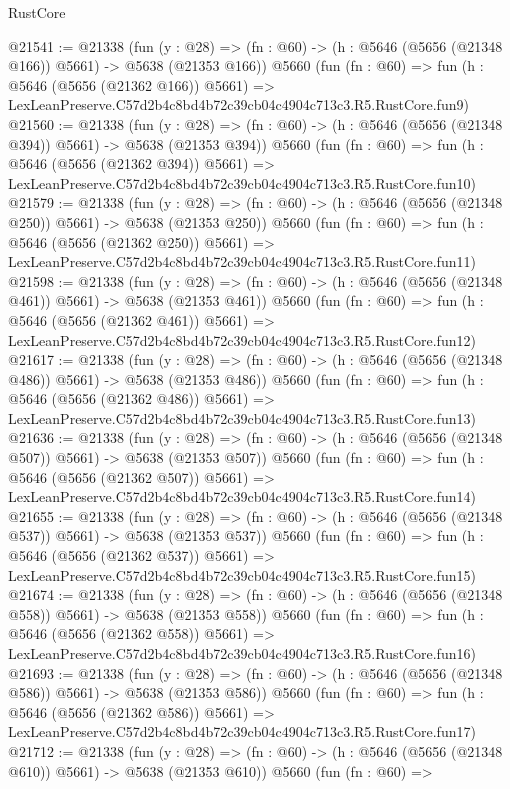 \begin{lexlean}{RustCore}
\begin{coremodule}
@21541 := @21338
    (fun (y : @28) => (fn : @60) -> (h : @5646 (@5656 (@21348 @166)) @5661) -> @5638 (@21353 @166))
    @5660
    (fun (fn : @60) =>
    fun (h : @5646 (@5656 (@21362 @166)) @5661) =>
    LexLeanPreserve.C57d2b4c8bd4b72c39cb04c4904c713c3.R5.RustCore.fun9)
@21560 := @21338
    (fun (y : @28) => (fn : @60) -> (h : @5646 (@5656 (@21348 @394)) @5661) -> @5638 (@21353 @394))
    @5660
    (fun (fn : @60) =>
    fun (h : @5646 (@5656 (@21362 @394)) @5661) =>
    LexLeanPreserve.C57d2b4c8bd4b72c39cb04c4904c713c3.R5.RustCore.fun10)
@21579 := @21338
    (fun (y : @28) => (fn : @60) -> (h : @5646 (@5656 (@21348 @250)) @5661) -> @5638 (@21353 @250))
    @5660
    (fun (fn : @60) =>
    fun (h : @5646 (@5656 (@21362 @250)) @5661) =>
    LexLeanPreserve.C57d2b4c8bd4b72c39cb04c4904c713c3.R5.RustCore.fun11)
@21598 := @21338
    (fun (y : @28) => (fn : @60) -> (h : @5646 (@5656 (@21348 @461)) @5661) -> @5638 (@21353 @461))
    @5660
    (fun (fn : @60) =>
    fun (h : @5646 (@5656 (@21362 @461)) @5661) =>
    LexLeanPreserve.C57d2b4c8bd4b72c39cb04c4904c713c3.R5.RustCore.fun12)
@21617 := @21338
    (fun (y : @28) => (fn : @60) -> (h : @5646 (@5656 (@21348 @486)) @5661) -> @5638 (@21353 @486))
    @5660
    (fun (fn : @60) =>
    fun (h : @5646 (@5656 (@21362 @486)) @5661) =>
    LexLeanPreserve.C57d2b4c8bd4b72c39cb04c4904c713c3.R5.RustCore.fun13)
@21636 := @21338
    (fun (y : @28) => (fn : @60) -> (h : @5646 (@5656 (@21348 @507)) @5661) -> @5638 (@21353 @507))
    @5660
    (fun (fn : @60) =>
    fun (h : @5646 (@5656 (@21362 @507)) @5661) =>
    LexLeanPreserve.C57d2b4c8bd4b72c39cb04c4904c713c3.R5.RustCore.fun14)
@21655 := @21338
    (fun (y : @28) => (fn : @60) -> (h : @5646 (@5656 (@21348 @537)) @5661) -> @5638 (@21353 @537))
    @5660
    (fun (fn : @60) =>
    fun (h : @5646 (@5656 (@21362 @537)) @5661) =>
    LexLeanPreserve.C57d2b4c8bd4b72c39cb04c4904c713c3.R5.RustCore.fun15)
@21674 := @21338
    (fun (y : @28) => (fn : @60) -> (h : @5646 (@5656 (@21348 @558)) @5661) -> @5638 (@21353 @558))
    @5660
    (fun (fn : @60) =>
    fun (h : @5646 (@5656 (@21362 @558)) @5661) =>
    LexLeanPreserve.C57d2b4c8bd4b72c39cb04c4904c713c3.R5.RustCore.fun16)
@21693 := @21338
    (fun (y : @28) => (fn : @60) -> (h : @5646 (@5656 (@21348 @586)) @5661) -> @5638 (@21353 @586))
    @5660
    (fun (fn : @60) =>
    fun (h : @5646 (@5656 (@21362 @586)) @5661) =>
    LexLeanPreserve.C57d2b4c8bd4b72c39cb04c4904c713c3.R5.RustCore.fun17)
@21712 := @21338
    (fun (y : @28) => (fn : @60) -> (h : @5646 (@5656 (@21348 @610)) @5661) -> @5638 (@21353 @610))
    @5660
    (fun (fn : @60) =>

\end{coremodule}
\end{lexlean}
